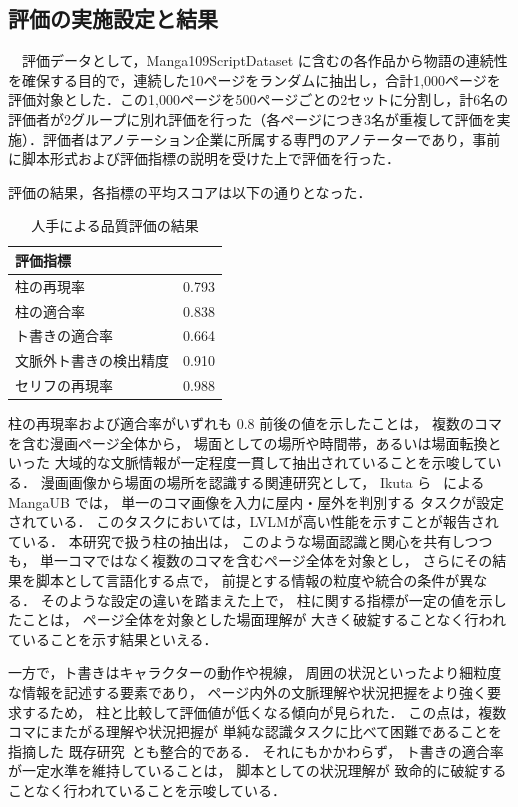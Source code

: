 \documentclass[a4j,12pt]{jsreport}
\begin{document}
\subsection{評価の実施設定と結果} 　評価データとして，Manga109ScriptDataset に含むの各作品から物語の連続性を確保する目的で，連続した10ページをランダムに抽出し，合計1,000ページを評価対象とした．この1,000ページを500ページごとの2セットに分割し，計6名の評価者が2グループに別れ評価を行った（各ページにつき3名が重複して評価を実施）．評価者はアノテーション企業に所属する専門のアノテーターであり，事前に脚本形式および評価指標の説明を受けた上で評価を行った．

評価の結果，各指標の平均スコアは以下の通りとなった．

\begin{table}[htbp]
   \centering
   \caption{人手による品質評価の結果}
   \label{tab:evaluation_results}
   \begin{tabular}{lr}
      \toprule
      \textbf{評価指標} & \textbf{} \\
      \midrule
      柱の再現率         & 0.793     \\
      柱の適合率         & 0.838     \\
      ト書きの適合率       & 0.664     \\
      文脈外ト書きの検出精度   & 0.910     \\
      セリフの再現率       & 0.988     \\
      \bottomrule
   \end{tabular}
\end{table}

柱の再現率および適合率がいずれも 0.8 前後の値を示したことは，
複数のコマを含む漫画ページ全体から，
場面としての場所や時間帯，あるいは場面転換といった
大域的な文脈情報が一定程度一貫して抽出されていることを示唆している．
漫画画像から場面の場所を認識する関連研究として，
Ikuta ら~\cite{ikuta_mangaub_2024} による MangaUB では，
単一のコマ画像を入力に屋内・屋外を判別する
タスクが設定されている．
このタスクにおいては，LVLMが高い性能を示すことが報告されている．
本研究で扱う柱の抽出は，
このような場面認識と関心を共有しつつも，
単一コマではなく複数のコマを含むページ全体を対象とし，
さらにその結果を脚本として言語化する点で，
前提とする情報の粒度や統合の条件が異なる．
そのような設定の違いを踏まえた上で，
柱に関する指標が一定の値を示したことは，
ページ全体を対象とした場面理解が
大きく破綻することなく行われていることを示す結果といえる．

一方で，ト書きはキャラクターの動作や視線，
周囲の状況といったより細粒度な情報を記述する要素であり，
ページ内外の文脈理解や状況把握をより強く要求するため，
柱と比較して評価値が低くなる傾向が見られた．
この点は，複数コマにまたがる理解や状況把握が
単純な認識タスクに比べて困難であることを指摘した
既存研究~\cite{ikuta_mangaub_2024}とも整合的である．
それにもかかわらず，
ト書きの適合率が一定水準を維持していることは，
脚本としての状況理解が
致命的に破綻することなく行われていることを示唆している．
\end{document}
